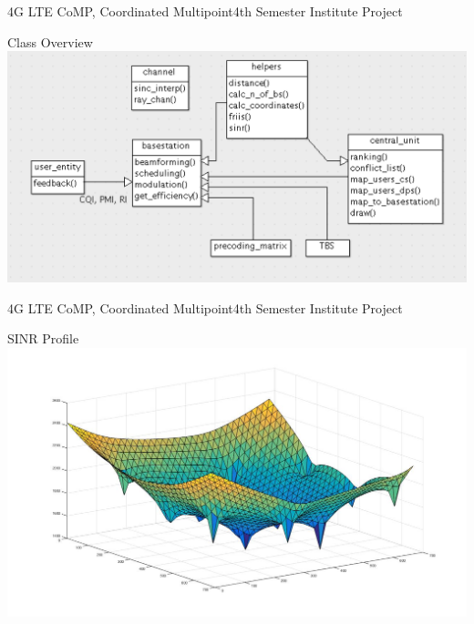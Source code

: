 \documentclass[xcolor={cmyk}]{beamer}
\begin{document}
  \begin{frame}{4G LTE CoMP, Coordinated Multipoint}{4th Semester Institute Project}
	 \begin{block}{Class Overview}
		 \includegraphics[width=\linewidth,height=\textheight,keepaspectratio]{klassen.png}
	 \end{block}
 \end{frame}

  \begin{frame}{4G LTE CoMP, Coordinated Multipoint}{4th Semester Institute Project}
	 \begin{block}{SINR Profile}
		 \includegraphics[width=\linewidth,height=\textheight,keepaspectratio]{sinr.jpg}
	 \end{block}
 \end{frame}
 
\end{document}
